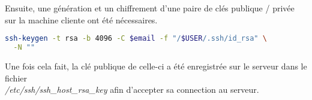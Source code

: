 Ensuite, une génération et un chiffrement d'une paire de clés publique / privée
sur la machine cliente ont été nécessaires.

\begin{lstlisting}[language=bash]
  ssh-keygen -t rsa -b 4096 -C $email -f "/$USER/.ssh/id_rsa" \
  -N ""
\end{lstlisting}

Une fois cela fait, la clé publique de celle-ci a été enregistrée sur le serveur
dans le fichier \\
\textit{/etc/ssh/ssh\_host\_rsa\_key} afin d'accepter sa connection au serveur.

